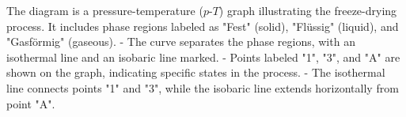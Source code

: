 The diagram is a pressure-temperature (\( p \)-\( T \)) graph illustrating the freeze-drying process. It includes phase regions labeled as "Fest" (solid), "Flüssig" (liquid), and "Gasförmig" (gaseous).  
- The curve separates the phase regions, with an isothermal line and an isobaric line marked.  
- Points labeled "1", "3", and "A" are shown on the graph, indicating specific states in the process.  
- The isothermal line connects points "1" and "3", while the isobaric line extends horizontally from point "A".